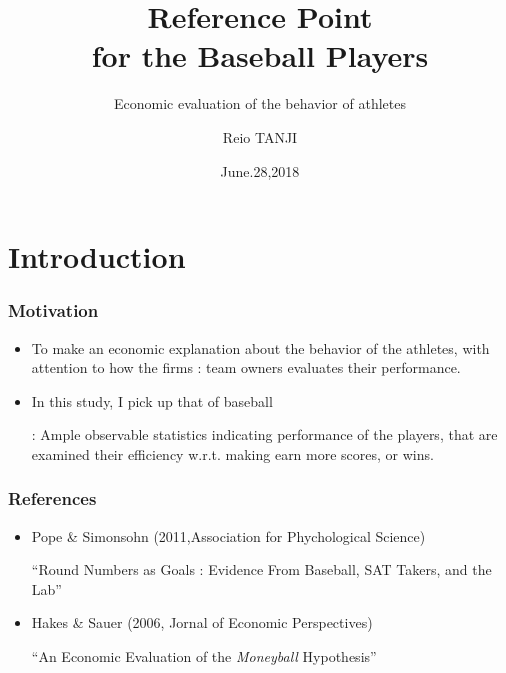 \documentclass[dvipdfmx,12pt]{beamer}
\title{Reference Point \\ for the Baseball Players}
\subtitle{Economic evaluation of the behavior of athletes}
\author{Reio TANJI}
\date{June.28,2018}
\institute{Osaka University}
\begin{document}
\begin{frame}
\titlepage
\end{frame}

\section{Introduction}
\begin{frame}\frametitle{Motivation}

 \begin{itemize}
 
 \item To make an economic explanation about the behavior of the athletes, with attention to how the firms : team owners evaluates their performance.
 
 \item In this study, I pick up that of baseball
 
 : Ample observable statistics indicating performance of the players, that are examined their efficiency w.r.t. making earn more scores, or wins.
 
 \end{itemize}

\end{frame}

\begin{frame}\frametitle{References}
 
 \begin{itemize}
  
  \item Pope \& Simonsohn (2011,Association for Phychological Science)
   
  ``Round Numbers as Goals : Evidence From Baseball, SAT Takers, and the Lab''
   
  \item Hakes \& Sauer (2006, Jornal of Economic Perspectives)
   
  ``An Economic Evaluation of the \textit{Moneyball} Hypothesis''
   
  \end{itemize}
 
\end{frame}
\end{document}

